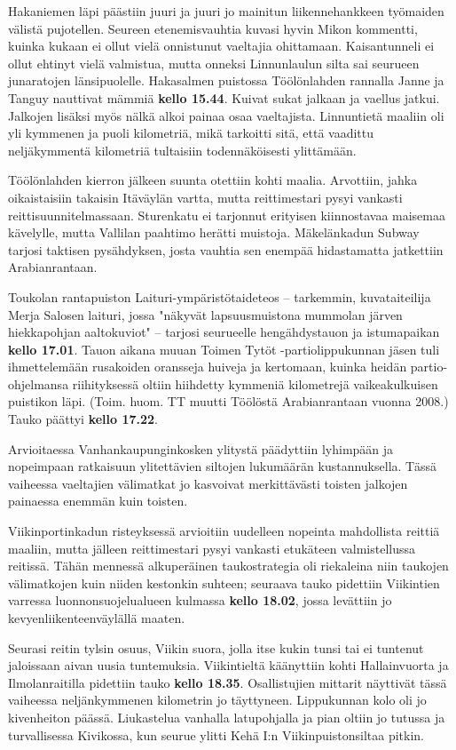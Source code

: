 \begin{multicols}{2}
	Hakaniemen läpi päästiin juuri ja juuri jo mainitun liikennehankkeen
	työmaiden välistä pujotellen. Seureen etenemisvauhtia kuvasi hyvin
	Mikon kommentti, kuinka kukaan ei ollut vielä onnistunut vaeltajia
	ohittamaan. Kaisantunneli ei ollut ehtinyt vielä valmistua, mutta
	onneksi Linnunlaulun silta sai seurueen junaratojen länsipuolelle.
	Hakasalmen puistossa Töölönlahden rannalla Janne ja Tanguy nauttivat
	mämmiä \textbf{kello 15.44}. Kuivat sukat jalkaan ja vaellus jatkui.
	Jalkojen lisäksi myös nälkä alkoi painaa osaa vaeltajista. Linnuntietä
	maaliin oli yli kymmenen ja puoli kilometriä, mikä tarkoitti sitä, että
	vaadittu neljäkymmentä kilometriä tultaisiin todennäköisesti
	ylittämään.

	Töölönlahden kierron jälkeen suunta otettiin kohti maalia. Arvottiin,
	jahka oikaistaisiin takaisin Itäväylän vartta, mutta reittimestari
	pysyi vankasti reittisuunnitelmassaan. Sturenkatu ei tarjonnut
	erityisen kiinnostavaa maisemaa kävelylle, mutta Vallilan paahtimo
	herätti muistoja. Mäkelänkadun Subway tarjosi taktisen pysähdyksen,
	josta vauhtia sen enempää hidastamatta jatkettiin Arabianrantaan.

	Toukolan rantapuiston Laituri-ympäristötaideteos – tarkemmin,
	kuvataiteilija Merja Salosen laituri, jossa "näkyvät lapsuusmuistona
	mummolan järven hiekkapohjan aaltokuviot" – tarjosi seurueelle
	hengähdystauon ja istumapaikan \textbf{kello 17.01}. Tauon aikana muuan
	Toimen Tytöt -partiolippukunnan jäsen tuli ihmettelemään rusakoiden
	oransseja huiveja ja kertomaan, kuinka heidän partio-ohjelmansa
	riihityksessä oltiin hiihdetty kymmeniä kilometrejä vaikeakulkuisen
	puistikon läpi. (Toim. huom. TT muutti Töölöstä Arabianrantaan vuonna
	2008.) Tauko päättyi \textbf{kello 17.22}.

	Arvioitaessa Vanhankaupunginkosken ylitystä päädyttiin lyhimpään ja
	nopeimpaan ratkaisuun ylitettävien siltojen lukumäärän kustannuksella.
	Tässä vaiheessa vaeltajien välimatkat jo kasvoivat merkittävästi
	toisten jalkojen painaessa enemmän kuin toisten.

	Viikinportinkadun risteyksessä arvioitiin uudelleen nopeinta
	mahdollista reittiä maaliin, mutta jälleen reittimestari pysyi vankasti
	etukäteen valmistellussa reitissä. Tähän mennessä alkuperäinen
	taukostrategia oli riekaleina niin taukojen välimatkojen kuin niiden
	kestonkin suhteen; seuraava tauko pidettiin Viikintien varressa
	luonnonsuojelualueen kulmassa \textbf{kello 18.02}, jossa levättiin jo
	kevyenliikenteenväylällä maaten.

	Seurasi reitin tylsin osuus, Viikin suora, jolla itse kukin tunsi tai
	ei tuntenut jaloissaan aivan uusia tuntemuksia. Viikintieltä käänyttiin
	kohti Hallainvuorta ja Ilmolanraitilla pidettiin tauko \textbf{kello
	18.35}. Osallistujien mittarit näyttivät tässä vaiheessa neljänkymmenen
	kilometrin jo täyttyneen. Lippukunnan kolo oli jo kivenheiton päässä.
	Liukastelua vanhalla latupohjalla ja pian oltiin jo tutussa ja
	turvallisessa Kivikossa, kun seurue ylitti Kehä I:n Viikinpuistonsiltaa
	pitkin.


\end{multicols}
